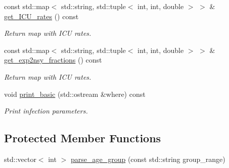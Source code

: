 \begin{DoxyCompactItemize}
const std\+::map$<$ std\+::string, std\+::tuple$<$ int, int, double $>$ $>$ \& \hyperlink{classInfection_adcee70238be54e9dad57cfebb2c32034}{get\+\_\+\+I\+C\+U\+\_\+rates} () const
\begin{DoxyCompactList}\small\item\em Return map with I\+CU rates. \end{DoxyCompactList}\item 
const std\+::map$<$ std\+::string, std\+::tuple$<$ int, int, double $>$ $>$ \& \hyperlink{classInfection_ab7245d95e87c6f7721770506218b93fe}{get\+\_\+exp2nsy\+\_\+fractions} () const
\begin{DoxyCompactList}\small\item\em Return map with I\+CU rates. \end{DoxyCompactList}\item 
void \hyperlink{classInfection_a706afb6867ac7e8ed917087363e30b30}{print\+\_\+basic} (std\+::ostream \&where) const
\begin{DoxyCompactList}\small\item\em Print infection parameters. \end{DoxyCompactList}\end{DoxyCompactItemize}
\subsection*{Protected Member Functions}
\begin{DoxyCompactItemize}
\item 
std\+::vector$<$ int $>$ \hyperlink{classInfection_aff2f19e5e147904023c0f7597f09c6ed}{parse\+\_\+age\+\_\+group} (const std\+::string group\+\_\+range)
\end{DoxyCompactItemize}

